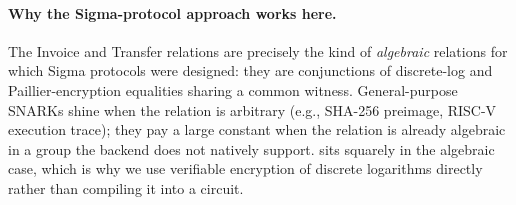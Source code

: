 \paragraph{Why the Sigma-protocol approach works here.} The Invoice and Transfer relations are precisely the kind of \emph{algebraic} relations for which Sigma protocols were designed: they are conjunctions of discrete-log and Paillier-encryption equalities sharing a common witness. General-purpose SNARKs shine when the relation is arbitrary (e.g., SHA-256 preimage, RISC-V execution trace); they pay a large constant when the relation is already algebraic in a group the backend does not natively support. \thunderbolt sits squarely in the algebraic case, which is why we use verifiable encryption of discrete logarithms directly rather than compiling it into a circuit.
